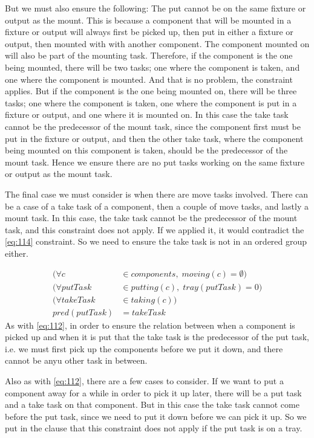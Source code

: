  But we must also ensure the following: The put cannot be on the same fixture or output as the mount. This is because a component that will be mounted in a fixture or output will always first be picked up, then put in either a fixture or output, then mounted with with another component. The component mounted on will also be part of the mounting task. Therefore, if the component is the one being mounted, there will be two tasks; one where the component is taken, and one where the component is mounted. And that is no problem, the constraint applies. But if the component is the one being mounted on, there will be three tasks; one where the component is taken, one where the component is put in a fixture or output, and one where it is mounted on. In this case the take task cannot be the predecessor of the mount task, since the component first must be put in the fixture or output, and then the other take task,  where the component being mounted on this component is taken, should be the predecessor of the mount task. Hence we ensure there are no put tasks working on the same fixture or output as the mount task.
 
 The final case we must consider is when there are move tasks involved. There can be a case of a take task of a component, then a couple of move tasks, and lastly a mount task. In this case, the take task cannot be the predecessor of the mount task, and this constraint does not apply. If we applied it, it would contradict the \ref{eq:114} constraint. So we need to ensure the take task is not in an ordered group either.
 
 \begin{equation}
 \begin{aligned}\label{eq:113}
 (\forall c &\in components, \; moving(c) = \emptyset)\\
 (\forall putTask &\in putting(c), \; tray(putTask) = 0)\\
 (\forall takeTask &\in taking(c))\\
 pred(putTask) &= takeTask
 \end{aligned}
 \end{equation}
 As with \ref{eq:112}, in order to ensure the relation between when a component is picked up and when it is put that the take task is the predecessor of the put task, i.e. we must first pick up the components before we put it down, and there cannot be anyu other task in between.
 
 Also as with \ref{eq:112}, there are a few cases to consider. If we want to put a component away for a while in order to pick it up later, there will be a put task and a take task on that component. But in this case the take task cannot come before the put task, since we need to put it down before we can pick it up. So we put in the clause that this constraint does not apply if the put task is on a tray.
 
